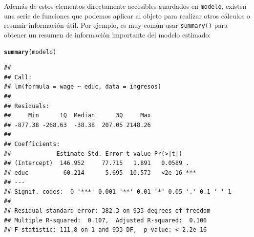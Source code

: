 \documentclass{report}\usepackage[]{graphicx}\usepackage[]{color}
\makeatletter
\newcommand{\hlstd}[1]{\textcolor[rgb]{0.345,0.345,0.345}{#1}}%
\newcommand{\hlkwd}[1]{\textcolor[rgb]{0.737,0.353,0.396}{\textbf{#1}}}%
\newenvironment{kframe}{%
 \def\at@end@of@kframe{}%
 \ifinner\ifhmode%
  \def\at@end@of@kframe{\end{minipage}}%
  \begin{minipage}{\columnwidth}%
 \fi\fi%
 \def\FrameCommand##1{\hskip\@totalleftmargin \hskip-\fboxsep
 \colorbox{shadecolor}{##1}\hskip-\fboxsep
     \hskip-\linewidth \hskip-\@totalleftmargin \hskip\columnwidth}%
 \MakeFramed {\advance\hsize-\width
   \@totalleftmargin\z@ \linewidth\hsize
   \@setminipage}}%
 {\par\unskip\endMakeFramed%
 \at@end@of@kframe}
\newenvironment{knitrout}{}{} %
\makeatother
\begin{document}
Además de estos elementos directamente accesibles guardados en \verb|modelo|, existen una serie de funciones que podemos aplicar al objeto para realizar otros cálculos o resumir información útil. Por ejemplo, es muy común usar \verb|summary()| para obtener un resumen de información importante del modelo estimado:
\begin{knitrout}
\color{fgcolor}\begin{kframe}
\begin{alltt}
\hlkwd{summary}\hlstd{(modelo)}
\end{alltt}
\begin{verbatim}
## 
## Call:
## lm(formula = wage ~ educ, data = ingresos)
## 
## Residuals:
##     Min      1Q  Median      3Q     Max 
## -877.38 -268.63  -38.38  207.05 2148.26 
## 
## Coefficients:
##             Estimate Std. Error t value Pr(>|t|)    
## (Intercept)  146.952     77.715   1.891   0.0589 .  
## educ          60.214      5.695  10.573   <2e-16 ***
## ---
## Signif. codes:  0 '***' 0.001 '**' 0.01 '*' 0.05 '.' 0.1 ' ' 1
## 
## Residual standard error: 382.3 on 933 degrees of freedom
## Multiple R-squared:  0.107,	Adjusted R-squared:  0.106 
## F-statistic: 111.8 on 1 and 933 DF,  p-value: < 2.2e-16
\end{verbatim}
\end{kframe}
\end{knitrout}

 
\nocite{*}
\printbibliography
\printindex
\end{document}
